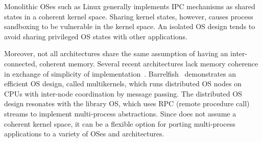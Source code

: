 Monolithic OSes such as Linux generally implements IPC mechanisms as shared states in a coherent kernel space.
Sharing kernel states, however, causes process sandboxing
to be vulnerable in the kernel space.
An isolated OS design tends to avoid sharing privileged OS states with other applications.


Moreover, not all architectures share the same assumption of having an inter-connected, coherent memory.
Several recent architectures lack memory coherence
in exchange of simplicity of implementation~\cite{gschwind2007,cascaval2002evaluation}.
Barrelfish~\cite{baumann09barrelfish} demonstrates an efficient OS design, called multikernels, which runs distributed OS nodes on CPUs with inter-node coordination by message passing.
The distributed OS design resonates with the \graphene{} library OS, which uses RPC (remote procedure call) streams to implement multi-process abstractions.
Since \graphene{} does not assume a coherent kernel space, it can be a flexible option
for porting multi-process applications to a variety of OSes and architectures.



\label{sec:intro:security}






